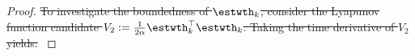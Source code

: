 \documentclass[letterpaper, journal]{IEEEtran}
\providecommand{\DIFdel}[1]{{\protect\color{red}\sout{#1}}} %
\providecommand{\DIFdelbegin}{} %
\begin{document}
\begin{proof}
\DIFdelbegin \DIFdel{To investigate the boundedness of $\estwth_k$, consider the Lyapunov function candidate $V_2:=\tfrac{1}{2\alpha}\estwth_k^\top \estwth_k$.
Taking the time derivative of $V_2$ yields:
}%

\end{proof}
\end{document}
